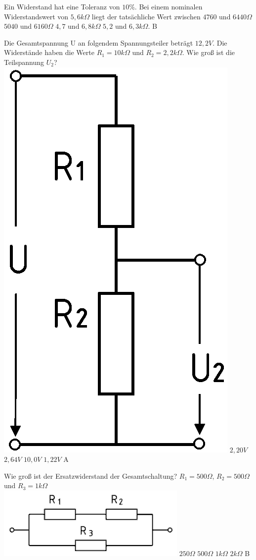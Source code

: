 {Ein Widerstand hat eine Toleranz von $10 \%$. Bei einem nominalen Widerstandswert von $5,6 k\Omega$ liegt der tatsächliche Wert zwischen}%
{$4760$ und $6440 \Omega$}%
{$5040$ und $6160 \Omega$}%
{$4,7$ und $6,8 k\Omega$}%
{$5,2$ und $6,3 k\Omega.$}%
{B}%

{Die Gesamtspannung U an folgendem Spannungsteiler beträgt $12,2V$. Die
Widerstände haben die Werte $R_1 = 10k\Omega$ und $R_2 = 2,2k\Omega$. Wie groß
ist die Teilspannung $U_2$?\\ \includegraphics[scale=0.15]{Spannungsteiler.png}}%
{$2,20V$}%
{$2,64V$}%
{$10,0V$}%
{$1,22V$}%
{A}%

{Wie groß ist der Ersatzwiderstand der Gesamtschaltung? 
$R_1 = 500\Omega$, $R_2 = 500\Omega$ und $R_3 = 1k\Omega$\\ \includegraphics[scale=0.4]{Parallelschaltung.png}}%
{$250\Omega$}%
{$500\Omega$}%
{$1k\Omega$}%
{$2k\Omega$}%
{B}%

